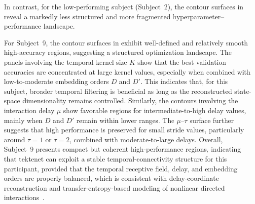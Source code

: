 {In contrast, for the low-performing subject (Subject~2), the contour surfaces in  reveal a markedly less structured and more fragmented hyperparameter--performance landscape.}

{For Subject~9, the contour surfaces in  exhibit well-defined and relatively smooth high-accuracy regions, suggesting a structured optimization landscape. The panels involving the temporal kernel size $K$ show that the best validation accuracies are concentrated at large kernel values, especially when combined with low-to-moderate embedding orders $D$ and $D'$. This indicates that, for this subject, broader temporal filtering is beneficial as long as the reconstructed state-space dimensionality remains controlled. Similarly, the contours involving the interaction delay $\mu$ show favorable regions for intermediate-to-high delay values, mainly when $D$ and $D'$ remain within lower ranges. The $\mu$--$\tau$ surface further suggests that high performance is preserved for small stride values, particularly around $\tau=1$ or $\tau=2$, combined with moderate-to-large delays. Overall, Subject~9 presents compact but coherent high-performance regions, indicating that \gls{tektenet} can exploit a stable temporal-connectivity structure for this participant, provided that the temporal receptive field, delay, and embedding orders are properly balanced, which is consistent with delay-coordinate reconstruction and transfer-entropy-based modeling of nonlinear directed interactions~\cite{schreiber2000measuring}.}

